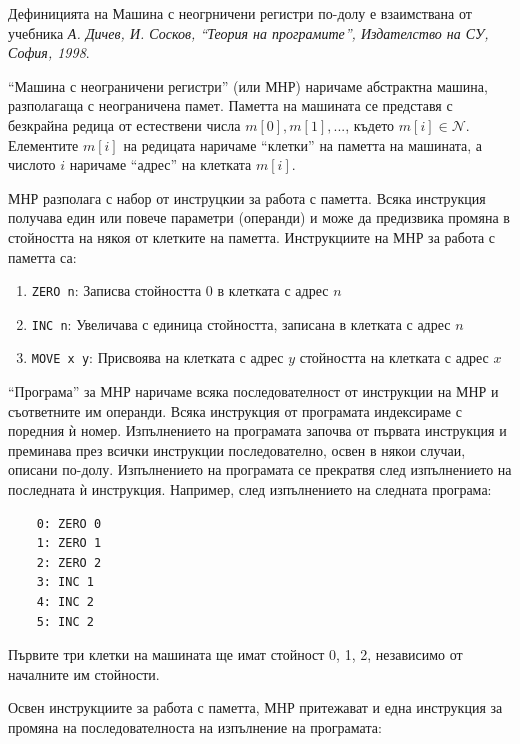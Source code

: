 \documentclass[12pt,a4paper]{article}
\newcommand{\code}[1]{\texttt{#1}}
\begin{document}
\small{Дефиницията на Машина с неогрничени регистри по-долу е взаимствана от учебника \cite{tprog}\textit{А. Дичев, И. Сосков, ``Теория на програмите'', Издателство на СУ, София, 1998}.

\vspace{20px}

\begin{mdframed}[hidealllines=true,backgroundcolor=gray!20]

	``Машина с неограничени регистри'' (или МНР) наричаме абстрактна машина, разполагаща с неограничена памет. Паметта на машината се представя с безкрайна редица от естествени числа $m[0],m[1],...$, където $m[i] \in \mathcal{N}$. Елементите $m[i]$ на редицата наричаме ``клетки'' на паметта на машината, а числото $i$ наричаме ``адрес'' на клетката $m[i]$.

	 МНР разполага с набор от инструцкии за работа с паметта. Всяка инструкция получава един или повече параметри (операнди) и може да предизвика промяна в стойността на някоя от клетките на паметта. Инструкциите на МНР за работа с паметта са:

	\begin{enumerate}[label=\arabic*)]
		\item \code{ZERO n}: Записва стойността 0 в клетката с адрес $n$
		\item \code{INC n}: Увеличава с единица стойността, записана в клетката с адрес $n$
		\item \code{MOVE x y}: Присвоява на клетката с адрес $y$ стойността на клетката с адрес $x$
	\end{enumerate}

	``Програма'' за МНР наричаме всяка последователност от инструкции на МНР и съответните им операнди. Всяка инструкция от програмата индексираме с поредния ѝ номер. Изпълнението на програмата започва от първата инструкция и преминава през всички инструкции последователно, освен в някои случаи, описани по-долу. Изпълнението на програмата се прекратвя след изпълнението на последната ѝ инструкция. Например, след изпълнението на следната програма:

	\begin{verbatim}
	0: ZERO 0
	1: ZERO 1
	2: ZERO 2
	3: INC 1
	4: INC 2
	5: INC 2
	\end{verbatim}

	Първите три клетки на машината ще имат стойност 0, 1, 2, независимо от началните им стойности.

	Освен инструкциите за работа с паметта, МНР притежават и една инструкция за промяна на последователноста на изпълнение на програмата:


\end{mdframed}}
\end{document}
